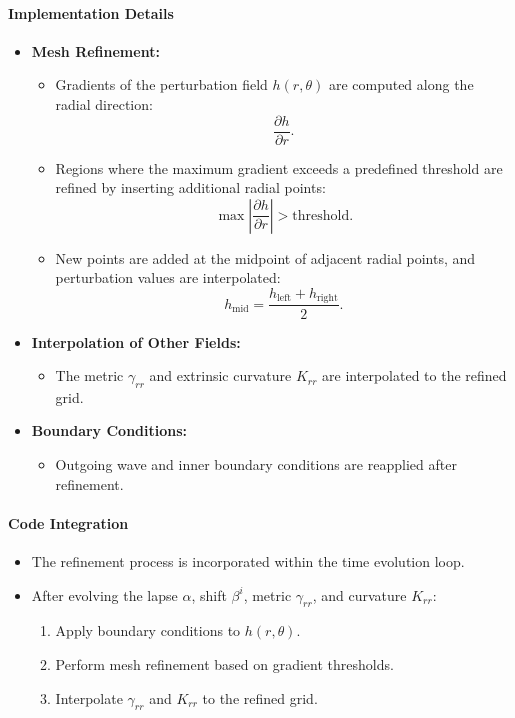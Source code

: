 \documentclass[12pt]{article}
\begin{document}
\paragraph{Implementation Details}
\begin{itemize}
    \item \textbf{Mesh Refinement:}
    \begin{itemize}
        \item Gradients of the perturbation field $h(r, \theta)$ are computed along the radial direction:
        \[
        \frac{\partial h}{\partial r}.
        \]
        \item Regions where the maximum gradient exceeds a predefined threshold are refined by inserting additional radial points:
        \[
        \max \left| \frac{\partial h}{\partial r} \right| > \text{threshold}.
        \]
        \item New points are added at the midpoint of adjacent radial points, and perturbation values are interpolated:
        \[
        h_{\text{mid}} = \frac{h_{\text{left}} + h_{\text{right}}}{2}.
        \]
    \end{itemize}
    \item \textbf{Interpolation of Other Fields:}
    \begin{itemize}
        \item The metric $\gamma_{rr}$ and extrinsic curvature $K_{rr}$ are interpolated to the refined grid.
    \end{itemize}
    \item \textbf{Boundary Conditions:}
    \begin{itemize}
        \item Outgoing wave and inner boundary conditions are reapplied after refinement.
    \end{itemize}
\end{itemize}

\paragraph{Code Integration}
\begin{itemize}
    \item The refinement process is incorporated within the time evolution loop.
    \item After evolving the lapse $\alpha$, shift $\beta^i$, metric $\gamma_{rr}$, and curvature $K_{rr}$:
    \begin{enumerate}
        \item Apply boundary conditions to $h(r, \theta)$.
        \item Perform mesh refinement based on gradient thresholds.
        \item Interpolate $\gamma_{rr}$ and $K_{rr}$ to the refined grid.
    \end{enumerate}
\end{itemize}
\end{document}
